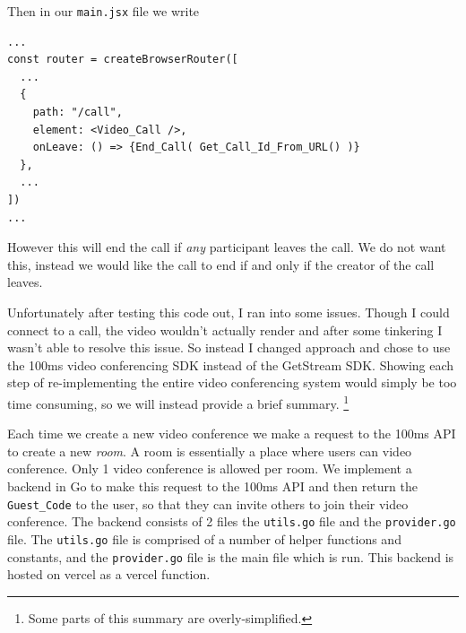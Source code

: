 Then in our \texttt{main.jsx} file we write

\begin{verbatim}
...
const router = createBrowserRouter([
  ...
  {
    path: "/call",
    element: <Video_Call />,
    onLeave: () => {End_Call( Get_Call_Id_From_URL() )}
  },
  ...
])
...
\end{verbatim}

However this will end the call if \textit{any} participant
leaves the call. We do not want this, instead we would like
the call to end if and only if the creator of the call leaves.\\
\vspace{0.2cm}

Unfortunately after testing this code out, I ran into some issues.
Though I could connect to a call, the video wouldn't actually
render and after some tinkering I wasn't able to resolve this issue.
So instead I changed approach and chose to use the 100ms video
conferencing SDK instead of the GetStream SDK. Showing each step
of re-implementing the entire video conferencing system would simply
be too time consuming, so we will instead provide a brief summary.
\footnote{Some parts of this summary are overly-simplified.}
\\ \vspace{0.2cm}

Each time we create a new video conference we make a request to
the 100ms API to create a new \textit{room}. A room is essentially
a place where users can video conference. Only 1 video conference is
allowed per room. We implement a backend in Go to make this request
to the 100ms API and then return the \texttt{Guest\_Code} to the user,
so that they can invite others to join their video conference. The
backend consists of 2 files the \texttt{utils.go} file and the
\texttt{provider.go} file. The \texttt{utils.go} file is comprised
of a number of helper functions and constants, and the \texttt{provider.go}
file is the main file which is run. This backend is hosted on vercel as
a vercel function. \\ \vspace{0.2cm}

